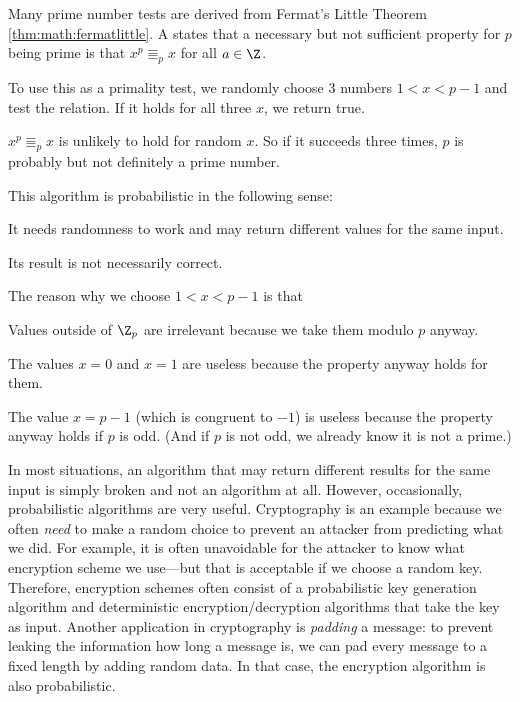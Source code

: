 \begin{example}
Many prime number tests are derived from Fermat's Little Theorem \ref{thm:math:fermatlittle}.
A states that a necessary but not sufficient property for $p$ being prime is that $x^p\Equiv_p x$ for all $a\in \Z$.

To use this as a primality test, we randomly choose $3$ numbers $1<x<p-1$ and test the relation.
If it holds for all three $x$, we return true.

$x^p\Equiv_p x$ is unlikely to hold for random $x$.
So if it succeeds three times, $p$ is probably but not definitely a prime number.

This algorithm is probabilistic in the following sense:
\begin{compactitem}
 \item It needs randomness to work and may return different values for the same input.
 \item Its result is not necessarily correct.
\end{compactitem}

The reason why we choose $1<x<p-1$ is that
\begin{compactitem}
 \item Values outside of $\Z_p$ are irrelevant because we take them modulo $p$ anyway.
 \item The values $x=0$ and $x=1$ are useless because the property anyway holds for them.
 \item The value $x=p-1$ (which is congruent to $-1$) is useless because the property anyway holds if $p$ is odd. (And if $p$ is not odd, we already know it is not a prime.)
\end{compactitem}
\end{example}

In most situations, an algorithm that may return different results for the same input is simply broken and not an algorithm at all.
However, occasionally, probabilistic algorithms are very useful.
Cryptography is an example because we often \emph{need} to make a random choice to prevent an attacker from predicting what we did.
For example, it is often unavoidable for the attacker to know what encryption scheme we use---but that is acceptable if we choose a random key.
Therefore, encryption schemes often consist of a probabilistic key generation algorithm and deterministic encryption/decryption algorithms that take the key as input.
Another application in cryptography is \emph{padding} a message: to prevent leaking the information how long a message is, we can pad every message to a fixed length by adding random data.
In that case, the encryption algorithm is also probabilistic.

